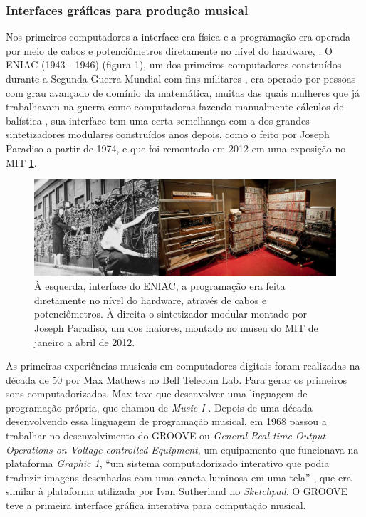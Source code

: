 \subsubsection{Interfaces gráficas para produção musical}

Nos primeiros computadores a interface era física e a programação era operada por meio de cabos e potenciômetros diretamente no nível do hardware, \cite[110]{Henrique1996}. O ENIAC (1943 - 1946) (figura 1), um dos primeiros computadores construídos durante a Segunda Guerra Mundial com fins militares \cite[24]{Stolfi}, era operado por pessoas com grau avançado de domínio da matemática, muitas das quais mulheres que já trabalhavam na guerra como computadoras fazendo manualmente cálculos de balística \cite{HayleyWilliams2015}, sua interface tem uma certa semelhança com a dos grandes sintetizadores modulares construídos anos depois, como o feito por Joseph Paradiso a partir de 1974, e que foi remontado em 2012 em uma exposição no MIT \ref{analogicos}. 

\begin{figure}[ht]
    \caption{\label{analogicos}À esquerda, interface do ENIAC, a programação era feita diretamente no nível do hardware, através de cabos e potenciômetros.  À direita o sintetizador modular montado por Joseph Paradiso, um dos maiores, montado no museu do MIT de janeiro a abril de 2012.}
    \begin{center}
        \includegraphics[width=1\linewidth]{pictures/analogicos}
    \end{center}
\end{figure}

As primeiras experiências musicais em computadores digitais foram realizadas na década de 50 por Max Mathews no Bell Telecom Lab. Para gerar os primeiros sons computadorizados, Max teve que desenvolver uma linguagem de programação própria, que chamou de \emph{Music I} \cite[253]{Holmes1985}. Depois de uma década desenvolvendo essa linguagem de programação musical, em 1968 passou a trabalhar no desenvolvimento do GROOVE ou \emph{General Real-time Output Operations on Voltage-controlled Equipment}, um equipamento que funcionava na plataforma \emph{Graphic 1}, ``um sistema computadorizado interativo que podia traduzir imagens desenhadas com uma caneta luminosa em uma tela'' \cite[253]{Holmes1985}, que era similar à plataforma utilizada por Ivan Sutherland no \emph{Sketchpad}. O GROOVE teve a primeira interface gráfica interativa para computação musical. 

